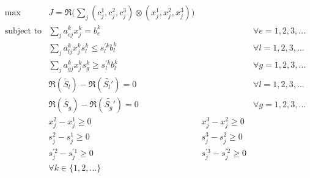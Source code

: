 \documentclass[ee,msthesis]{usuthesis}
\begin{document}
\begin{equation}
\label{eq:kumar-kaurs-crisp}
\begin{array}{lllc}
\text{max}    & J = \mathfrak{R}\Big(\sum_j (c_j^1,c_j^2,c_j^3) \otimes (x_j^1,x_j^2,x_j^3)\Big) &                             &                                          \\
\text{subject to}  & \sum_j a_{ej}^k x_j^k = b_e^k                                &                                &   \forall e = 1,2,3,...        \\
                   & \sum_j a_{lj}^k x_j^k s_l^k \le s_l^{'k} b_l^k                 &                                &   \forall l = 1,2,3,...       \\
                   & \sum_j a_{gj}^k x_j^k s_g^k \ge s_l^{'k} b_l^k                 &                                &   \forall g = 1,2,3,...      \\
                   & \mathfrak{R}(\tilde{S_l}) - \mathfrak{R}(\tilde{S_l'}) = 0                      &                                &  \forall l = 1,2,3,...          \\
                   & \mathfrak{R}(\tilde{S_g}) - \mathfrak{R}(\tilde{S_g'}) = 0                      &                                &  \forall g = 1,2,3,...          \\
                   & x_j^2 - x_j^1 \ge 0                                              &x_j^3 - x_j^2 \ge 0 &         \\
                   & s_j^2 - s_j^1 \ge 0                                              &s_j^3 - s_j^2 \ge 0 &         \\
                   & s_j^{'2} - s_j^{'1} \ge 0                                        &s_j^{'3} - s_j^{'2} \ge 0 & \\
                   & \forall k \in \{1,2,...\}                                            &                            &                       \\
\end{array}
\end{equation}
\end{document}
